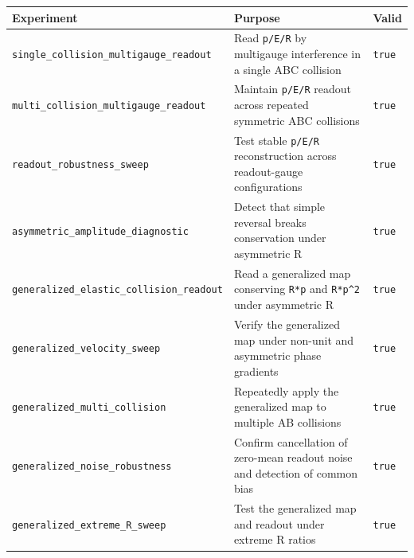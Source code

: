 \documentclass[
  a4paper,
]{article}
\newcounter{none} %
\begin{document}
{\def\LTcaptype{none} %
\begin{longtable}[]{@{}
  >{\raggedright\arraybackslash}p{}
  >{\raggedright\arraybackslash}p{}
  >{\raggedright\arraybackslash}p{}@{}}
\toprule\noalign{}
\begin{minipage}[b]{\linewidth}\raggedright
Experiment
\end{minipage} & \begin{minipage}[b]{\linewidth}\raggedright
Purpose
\end{minipage} & \begin{minipage}[b]{\linewidth}\raggedright
Valid
\end{minipage} \\
\midrule\noalign{}
\endhead
\bottomrule\noalign{}
\endlastfoot
\texttt{single\_collision\_multigauge\_readout} & Read \texttt{p/E/R} by
multigauge interference in a single ABC collision & \texttt{true} \\
\texttt{multi\_collision\_multigauge\_readout} & Maintain \texttt{p/E/R}
readout across repeated symmetric ABC collisions & \texttt{true} \\
\texttt{readout\_robustness\_sweep} & Test stable \texttt{p/E/R}
reconstruction across readout-gauge configurations & \texttt{true} \\
\texttt{asymmetric\_amplitude\_diagnostic} & Detect that simple reversal
breaks conservation under asymmetric R & \texttt{true} \\
\texttt{generalized\_elastic\_collision\_readout} & Read a generalized
map conserving \texttt{R*p} and \texttt{R*p\^{}2} under asymmetric R &
\texttt{true} \\
\texttt{generalized\_velocity\_sweep} & Verify the generalized map under
non-unit and asymmetric phase gradients & \texttt{true} \\
\texttt{generalized\_multi\_collision} & Repeatedly apply the
generalized map to multiple AB collisions & \texttt{true} \\
\texttt{generalized\_noise\_robustness} & Confirm cancellation of
zero-mean readout noise and detection of common bias & \texttt{true} \\
\texttt{generalized\_extreme\_R\_sweep} & Test the generalized map and
readout under extreme R ratios & \texttt{true} \\
\end{longtable}
}
\end{document}

